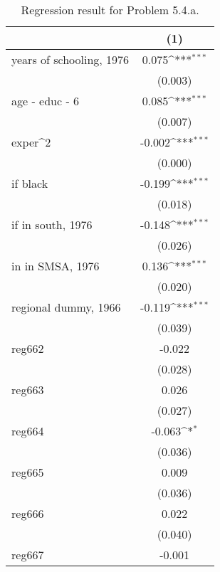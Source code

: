 \begin{table}[htbp]\centering
\def\sym#1{\ifmmode^{#1}\else\(^{#1}\)\fi}
\caption{Regression result for Problem 5.4.a.}
\begin{tabular}{l*{1}{c}}
\toprule
                    &\multicolumn{1}{c}{(1)}         \\
\midrule
years of schooling, 1976&       0.075\sym{***}\\
                    &     (0.003)         \\
\addlinespace
age - educ - 6      &       0.085\sym{***}\\
                    &     (0.007)         \\
\addlinespace
exper^2             &      -0.002\sym{***}\\
                    &     (0.000)         \\
\addlinespace
=1 if black         &      -0.199\sym{***}\\
                    &     (0.018)         \\
\addlinespace
=1 if in south, 1976&      -0.148\sym{***}\\
                    &     (0.026)         \\
\addlinespace
=1 in in SMSA, 1976 &       0.136\sym{***}\\
                    &     (0.020)         \\
\addlinespace
regional dummy, 1966&      -0.119\sym{***}\\
                    &     (0.039)         \\
\addlinespace
reg662              &      -0.022         \\
                    &     (0.028)         \\
\addlinespace
reg663              &       0.026         \\
                    &     (0.027)         \\
\addlinespace
reg664              &      -0.063\sym{*}  \\
                    &     (0.036)         \\
\addlinespace
reg665              &       0.009         \\
                    &     (0.036)         \\
\addlinespace
reg666              &       0.022         \\
                    &     (0.040)         \\
\addlinespace
reg667              &      -0.001         \\

\end{tabular}
\end{table}
